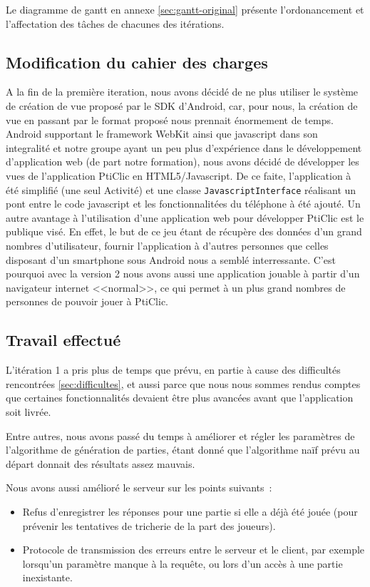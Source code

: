 \documentclass[a4paper,11pt,french]{article}
\def\android{Android\texttrademark{}}
\begin{document}
{Le diagramme de gantt en annexe \ref{sec:gantt-original} présente l'ordonancement et l'affectation des tâches de chacunes des itérations.

\subsection{Modification du cahier des charges}
A la fin de la première iteration, nous avons décidé de ne plus utiliser le système de création de vue proposé par le SDK d'\android{}, car,
pour nous, la création de vue en passant par le format proposé nous prennait énormement de temps. \android{} supportant le framework WebKit
ainsi que javascript dans son integralité et notre groupe ayant un peu plus d'expérience dans le développement d'application web (de part
notre formation), nous avons décidé de développer les vues de l'application PtiClic en HTML5/Javascript. De ce faite, l'application à été
simplifié (une seul Activité) et une classe \verb!JavascriptInterface! réalisant un pont entre le code javascript et les fonctionnalitées du
téléphone à été ajouté.  Un autre avantage à l'utilisation d'une application web pour développer PtiClic est le publique visé. En effet, le
but de ce jeu étant de récupère des données d'un grand nombres d'utilisateur, fournir l'application à d'autres personnes que celles
disposant d'un smartphone sous \android{} nous a semblé interressante. C'est pourquoi avec la version 2 nous avons aussi une application
jouable à partir d'un navigateur internet <<normal>>, ce qui permet à un plus grand nombres de personnes de pouvoir jouer à PtiClic.

\subsection{Travail effectué}

L'itération 1 a pris plus de temps que prévu, en partie à cause des difficultés rencontrées \ref{sec:difficultes}, et aussi parce que nous
nous sommes rendus comptes que certaines fonctionnalités devaient être plus avancées avant que l'application soit livrée.

Entre autres, nous avons passé du temps à améliorer et régler les paramètres de l'algorithme de génération de parties, étant donné que
l'algorithme naïf prévu au départ donnait des résultats assez mauvais.

Nous avons aussi amélioré le serveur sur les points suivants~:
\begin{itemize}
\item Refus d'enregistrer les réponses pour une partie si elle a déjà été jouée (pour prévenir les tentatives de tricherie de la part des joueurs).
\item Protocole de transmission des erreurs entre le serveur et le client, par exemple lorsqu'un paramètre manque à la requête, ou lors d'un
  accès à une partie inexistante.
\end{itemize}

}
\end{document}
